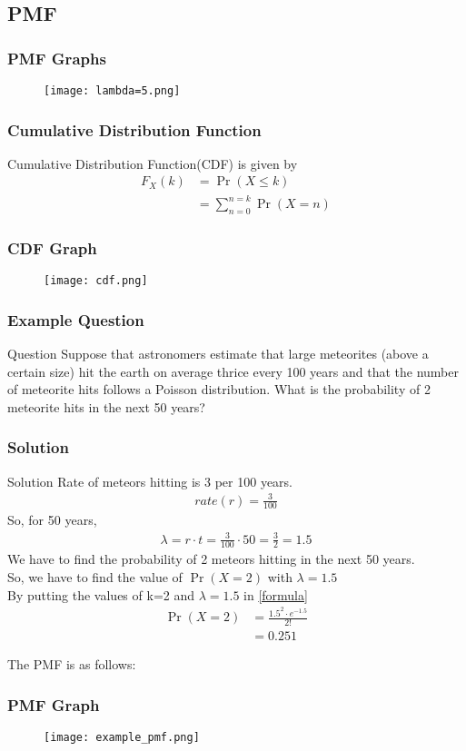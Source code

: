 \documentclass{beamer}
\providecommand{\pr}[1]{\ensuremath{\Pr\left(#1\right)}}
\begin{document}
\subsection{PMF}
\begin{frame}
\frametitle{PMF Graphs}
\begin{figure}
    \texttt{[image: lambda=5.png]}
\end{figure}
\end{frame}
\begin{frame}
\frametitle{Cumulative Distribution Function}
Cumulative Distribution Function(CDF) is given by
\begin{align}
    F_X(k)&=\pr{X\le k}\\
    &=\sum_{n=0}^{n=k}\pr{X=n}
\end{align}
\end{frame}
\begin{frame}
\frametitle{CDF Graph}
\begin{figure}
    \texttt{[image: cdf.png]}
\end{figure}
\end{frame}
\begin{frame}
\frametitle{Example Question}
\begin{block}{Question}
Suppose that astronomers estimate that large meteorites (above a certain size) hit the earth on average thrice every 100 years and that the number of meteorite hits follows a Poisson distribution. What is the probability of  2 meteorite hits in the next 50 years?
\end{block}
\end{frame}
\begin{frame}
\frametitle{Solution}
\begin{block}{Solution}
Rate of meteors hitting is 3 per 100 years.\\
\begin{align}
    rate(r)=\frac{3}{100}
\end{align}
So, for 50 years, 
\begin{align}
    \lambda=r\cdot t=\frac{3}{100}\cdot 50=\frac{3}{2}=1.5
\end{align}
We have to find the probability of 2 meteors hitting in the next 50 years.\\
So, we have to find the value of $\pr{X=2}$ with $\lambda=1.5$\\
By putting the values of k=2 and $\lambda=1.5$ in \eqref{formula}
\begin{align}
    \pr{X=2}&=\frac{1.5^2\cdot e^{-1.5}}{2!}\\
    &=0.251
\end{align}
\end{block}
The PMF is as follows:
\end{frame}
\begin{frame}
\frametitle{PMF Graph}
\begin{figure}
    \texttt{[image: example\_pmf.png]}
\end{figure}
\end{frame}
\end{document}

